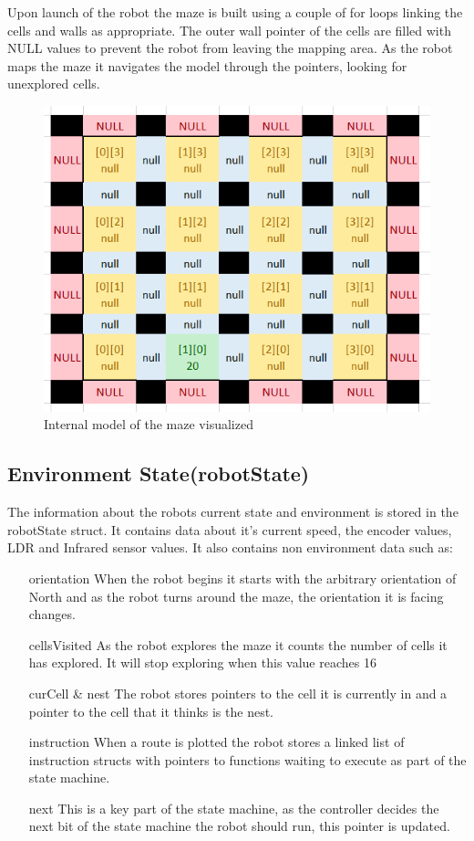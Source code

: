 \documentclass[11pt,a4paper,titlepage]{article}
\begin{document}
            Upon launch of the robot the maze is built using a couple of for loops linking the cells and walls as appropriate. 
            The outer wall pointer of the cells are filled with NULL values to prevent the robot from leaving the mapping area.
            As the robot maps the maze it navigates the model through the pointers, looking for unexplored cells.
            \begin{figure}[H]
                \caption{Internal model of the maze visualized}
                \includegraphics[width=14cm,keepaspectratio]{mazeModel}
            \end{figure}
        \subsection{Environment State(robotState)}
            The information about the robots current state and environment is stored in the robotState struct.
            It contains data about it's current speed, the encoder values, LDR and Infrared sensor values.
            It also contains non environment data such as:
            \begin{itemize}
                \item[orientation] When the robot begins it starts with the arbitrary orientation of North and as the robot turns around the maze, the orientation it is facing changes.
                \item[cellsVisited] As the robot explores the maze it counts the number of cells it has explored. It will stop exploring when this value reaches 16
                \item[curCell \& nest] The robot stores pointers to the cell it is currently in and a pointer to the cell that it thinks is the nest.
                \item[instruction] When a route is plotted the robot stores a linked list of instruction structs with pointers to functions waiting to execute as part of the state machine.
                \item[next] This is a key part of the state machine, as the controller decides the next bit of the state machine the robot should run, this pointer is updated.
            \end{itemize}
\end{document}
